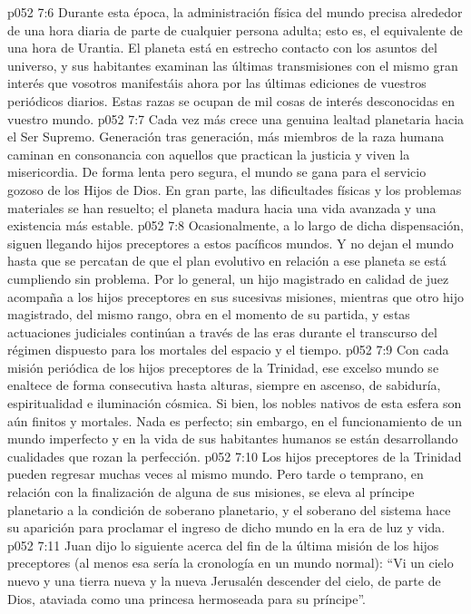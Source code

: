 \vs p052 7:6 Durante esta época, la administración física del mundo precisa alrededor de una hora diaria de parte de cualquier persona adulta; esto es, el equivalente de una hora de Urantia. El planeta está en estrecho contacto con los asuntos del universo, y sus habitantes examinan las últimas transmisiones con el mismo gran interés que vosotros manifestáis ahora por las últimas ediciones de vuestros periódicos diarios. Estas razas se ocupan de mil cosas de interés desconocidas en vuestro mundo.
\vs p052 7:7 \pc Cada vez más crece una genuina lealtad planetaria hacia el Ser Supremo. Generación tras generación, más miembros de la raza humana caminan en consonancia con aquellos que practican la justicia y viven la misericordia. De forma lenta pero segura, el mundo se gana para el servicio gozoso de los Hijos de Dios. En gran parte, las dificultades físicas y los problemas materiales se han resuelto; el planeta madura hacia una vida avanzada y una existencia más estable.
\vs p052 7:8 \pc Ocasionalmente, a lo largo de dicha dispensación, siguen llegando hijos preceptores a estos pacíficos mundos. Y no dejan el mundo hasta que se percatan de que el plan evolutivo en relación a ese planeta se está cumpliendo sin problema. Por lo general, un hijo magistrado en calidad de juez acompaña a los hijos preceptores en sus sucesivas misiones, mientras que otro hijo magistrado, del mismo rango, obra en el momento de su partida, y estas actuaciones judiciales continúan a través de las eras durante el transcurso del régimen dispuesto para los mortales del espacio y el tiempo.
\vs p052 7:9 Con cada misión periódica de los hijos preceptores de la Trinidad, ese excelso mundo se enaltece de forma consecutiva hasta alturas, siempre en ascenso, de sabiduría, espiritualidad e iluminación cósmica. Si bien, los nobles nativos de esta esfera son aún finitos y mortales. Nada es perfecto; sin embargo, en el funcionamiento de un mundo imperfecto y en la vida de sus habitantes humanos se están desarrollando cualidades que rozan la perfección.
\vs p052 7:10 \pc Los hijos preceptores de la Trinidad pueden regresar muchas veces al mismo mundo. Pero tarde o temprano, en relación con la finalización de alguna de sus misiones, se eleva al príncipe planetario a la condición de soberano planetario, y el soberano del sistema hace su aparición para proclamar el ingreso de dicho mundo en la era de luz y vida.
\vs p052 7:11 Juan dijo lo siguiente acerca del fin de la última misión de los hijos preceptores (al menos esa sería la cronología en un mundo normal): “Vi un cielo nuevo y una tierra nueva y la nueva Jerusalén descender del cielo, de parte de Dios, ataviada como una princesa hermoseada para su príncipe”.
